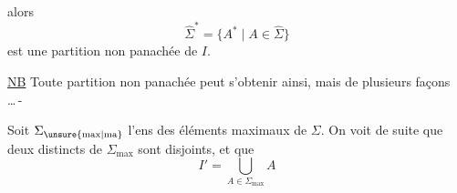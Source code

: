 alors \[ \hat{\Sigma}^{\ast}=\{A^{\ast}\mid A\in\hat{\Sigma}\} \] est une partition non panachée de $I$.

\uline{NB} Toute partition non panachée peut s'obtenir ainsi, mais de plusieurs façons \ldots\,-

Soit $\Sigma_{\unsure{\mathrm{max}|\mathrm{ma}}}$ l'ens des éléments maximaux de $\Sigma$. On voit de suite que deux  distincts de $\Sigma_{\mathrm{max}}$ sont disjoints, et que \[ I'=\bigcup_{A\in\Sigma_{\mathrm{max}}}A \]
